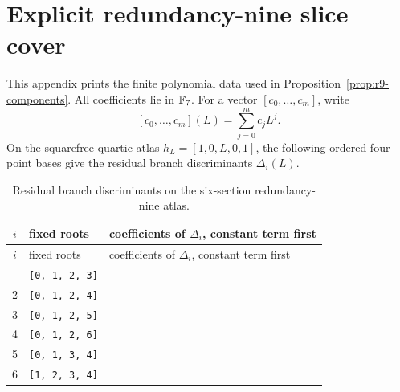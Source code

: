 \section{Explicit redundancy-nine slice cover}\label{app:r9-slices}

This appendix prints the finite polynomial data used in
Proposition~\ref{prop:r9-components}.  All coefficients lie in $\mathbb F_7$.
For a vector $[c_0,\ldots,c_m]$, write
\[
 [c_0,\ldots,c_m](L)=\sum_{j=0}^m c_jL^j.
\]
On the squarefree quartic atlas $h_L=[1,0,L,0,1]$, the following
ordered four-point bases give the residual branch discriminants
$\Delta_i(L)$.

\begingroup
\scriptsize
\setlength{\tabcolsep}{3pt}
\begin{longtable}{c p{} p{}}
\caption{Residual branch discriminants on the six-section redundancy-nine
atlas.}\label{tab:r9-slice-discriminants}\\
\toprule
$i$ & fixed roots & coefficients of $\Delta_i$, constant term first\\
\midrule
\endfirsthead
\toprule
$i$ & fixed roots & coefficients of $\Delta_i$, constant term first\\
\midrule
\endhead
\bottomrule
\endfoot
1 & \texttt{[0, 1, 2, 3]} &
\ttfamily[6, 0, 6, 0, 3, 4, 5, 5, 0, 0, 2, 6, 1, 3, 3, 0, 0, 4, 5, 2, 6, 0, 0, 1, 1]\\
2 & \texttt{[0, 1, 2, 4]} &
\ttfamily[0, 0, 4, 5, 1, 5, 2, 3, 1, 6, 1, 5, 4, 6, 0, 3, 0, 0, 4, 1, 2, 0, 6, 0, 4]\\
3 & \texttt{[0, 1, 2, 5]} &
\ttfamily[2, 6, 2, 1, 1, 3, 0, 1, 6, 5, 0, 2, 3, 4, 4, 4, 5, 4, 0, 4, 6, 3, 1, 5, 5]\\
4 & \texttt{[0, 1, 2, 6]} &
\ttfamily[0, 0, 0, 0, 0, 0, 3, 0, 0, 6, 5, 0, 0, 1, 0, 0, 2, 4, 0, 0, 3, 0, 0, 6, 5]\\
5 & \texttt{[0, 1, 3, 4]} &
\ttfamily[6, 1, 3, 4, 6, 5, 4, 6, 6, 4, 0, 0, 2, 6, 1, 0, 1, 2, 5, 4, 1, 5, 4, 3, 5]\\
6 & \texttt{[1, 2, 3, 4]} &
\ttfamily[6, 5, 5, 6, 0, 4, 0, 5, 6, 3, 6, 6, 0, 3, 4, 1, 4, 2, 3]\\
\end{longtable}

